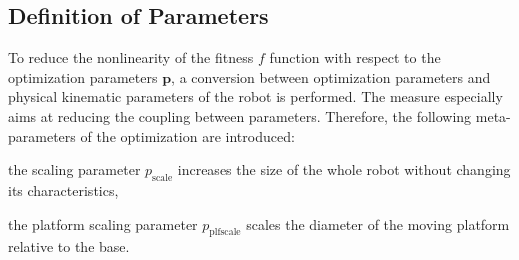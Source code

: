\documentclass[fleqn,a4paper,10pt]{article}
\newcommand{\bm}[1]{\mathbf{#1}}
\begin{document}
\begin{multicols}{2}








\subsection{Definition of Parameters}
\label{sec:opt_params}

To reduce the nonlinearity of the fitness $f$ function with respect to the optimization parameters $\bm{p}$, a conversion between optimization parameters and physical kinematic parameters of the robot is performed.
The measure especially aims at reducing the coupling between parameters.
Therefore, the following meta-parameters of the optimization are introduced:
\begin{compactitem}
\item the scaling parameter $p_\mathrm{scale}$ increases the size of the whole robot without changing its characteristics,%
\item the platform scaling parameter $p_\mathrm{plfscale}$ scales the diameter of the moving platform relative to the base.
\end{compactitem}


\end{multicols}
\end{document}
